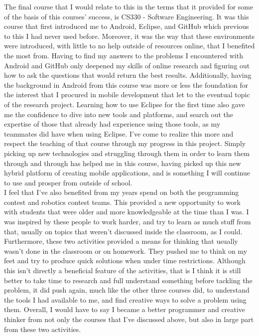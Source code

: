 \documentclass[11pt, twocolumn]{article}
\begin{document}
The final course that I would relate to this in the terms that it provided for some of the basis of this courses' success, is CS330 - Software Engineering.  It was this course that first introduced me to Android, Eclipse, and GitHub which previous to this I had never used before.  Moreover, it was the way that these environments were introduced, with little to no help outside of resources online, that I benefited the most from.  Having to find my answers to the problems I encountered with Android and GitHub only deepened my skills of online research and figuring out how to ask the questions that would return the best results.  Additionally, having the background in Android from this course was more or less the foundation for the interest that I procured in mobile development that let to the eventual topic of the research project.  Learning how to use Eclipse for the first time also gave me the confidence to dive into new tools and platforms, and search out the expertise of those that already had experience using those tools, as my teammates did have when using Eclipse.  I've come to realize this more and respect the teaching of that course through my progress in this project. Simply picking up new technologies and struggling through them in order to learn them through and through has helped me in this course, having picked up this new hybrid platform of creating mobile applications, and is something I will continue to use and prosper from outside of school.\\

I feel that I've also benefited from my years spend on both the programming contest and robotics contest teams.  This provided a new opportunity to work with students that were older and more knowledgeable at the time than I was.  I was inspired by these people to work harder, and try to learn as much stuff from that, usually on topics that weren't discussed inside the classroom, as I could.  Furthermore, these two activities provided a means for thinking that usually wasn't done in the classroom or on homework.  They pushed me to think on my feet and try to produce quick solutions when under time restrictions.  Although this isn't directly a beneficial feature of the activities, that is I think it is still better to take time to research and full understand something before tackling the problem, it did push again, much like the other three courses did, to understand the tools I had available to me, and find creative ways to solve a problem using them.  Overall, I would have to say I became a better programmer and creative thinker from not only the courses that I've discussed above, but also in large part from these two activities.\\
\end{document}
